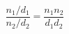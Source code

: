 \documentclass[12pt]{article}
\begin{document}
\sicpsize
\[
\frac{n_1 / d_1}{n_2 / d_2} = \frac{n_1n_2}{d_1d_2}
\]
\end{document}

